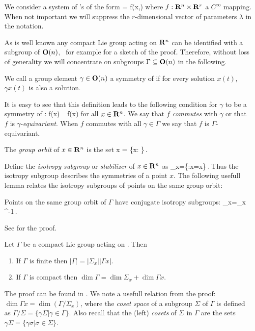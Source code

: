 
We consider a system of \ode's of the form
\beq
	 = f(x,\lambda)
	\label{eq:dynsys}
\eeq
where $f: \mathbf{R}^{n}\times\mathbf{R}^{r}$ a $C^\infty$ mapping. When
not important we will suppress the $r$-dimensional vector of parameters
$\lambda$ in the notation. 

As is well known any compact Lie group acting on $\mathbf{R}^{n}$ can be identified
with a subgroup of $\mathbf{O}(n)$, \cf\ for example  
for a sketch of the proof. Therefore, without loss of generality
we will concentrate on subgroups $\Gamma\subseteq\mathbf{O}(n)$ in the following.

\begin{definition}
We call a group element $\gamma\in\mathbf{O}(n)$ a symmetry of  if for every solution
$x(t)$, $\gamma x(t)$ is also a solution.
\end{definition}

It is easy to see that this definition leads to the following condition for $\gamma$ to
be a symmetry of :  
\beq
	f(\gamma x) =\gamma f(x)
	\label{eq:equiv}
\eeq
for all $x\in\mathbf{R}^{n}$. We say that $f$ \emph{commutes} with $\gamma$ or that $f$ is $\gamma$-\emph{equivariant}.
When $f$ commutes with all $\gamma\in\Gamma$ we say that $f$ is $\Gamma$-equivariant. 


The \emph{group orbit} of $x\in\mathbf{R}^{n}$ is the set 
\beq
	\Gamma x = \{\gamma x: \gamma\in\Gamma\}\,.
\eeq

Define the \emph{isotropy subgroup} or \emph{stabilizer} of $x\in\mathbf{R}^{n}$ as
\beq
	\Sigma_x=\{\gamma\in\Gamma:\gamma x=x\}\,.
\eeq
Thus the isotropy subgroup describes the symmetries of a point $x$. The following usefull lemma
relates the isotropy subgroups of points on the same group orbit:

\begin{lemma}
Points on the same group orbit of $\Gamma$ have conjugate isotropy subgroups:
\beq
	\Sigma_{\gamma x}=\gamma \Sigma_x \gamma^{-1}\,.
\eeq
\end{lemma}
See  for the proof.

\begin{proposition}
 Let $\Gamma$ be a compact Lie group acting on . Then
 \begin{enumerate}
  \item If $\Gamma$ is finite then $|\Gamma|=|\Sigma_x||\Gamma x|$.
  \item If $\Gamma$ is compact then $\dim \Gamma = \dim \Sigma_x+\dim \Gamma x$.
 \end{enumerate}
\end{proposition}
The proof can be found in . We note a usefull relation from the proof: $\dim\Gamma x =\dim(\Gamma/\Sigma_x)$, where the \emph{coset space} of a subgroup $\Sigma$  of $\Gamma$ is defined as $\Gamma/\Sigma=\{\gamma\Sigma|\gamma\in\Gamma\}$. Also recall that the (left) \emph{cosets} of $\Sigma$ in $\Gamma$ are the sets $\gamma\Sigma=\{\gamma\sigma|\sigma\in\Sigma\}$.



